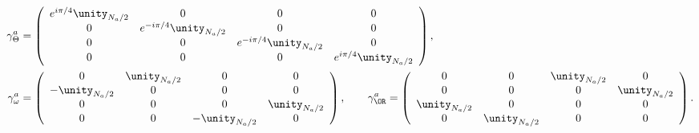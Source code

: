 \begin{equation}
\begin{aligned}
\gamma^a_{\Theta} &= \left(\begin{array}{cccc}
e^{i\pi/4}\unity_{N_a/2}  & 0 & 0 & 0\\
0 & e^{-i\pi/4}\unity_{N_a/2} & 0 & 0\\
0 & 0 & e^{-i\pi/4}\unity_{N_a/2} & 0\\
0 & 0 & 0 & e^{i\pi/4}\unity_{N_a/2}
\end{array}\right),\\
\gamma^a_{\omega} & = \left(\begin{array}{cccc}
0 &  \unity_{N_a/2} & 0 & 0\\
-\unity_{N_a/2} & 0 & 0 & 0\\
0 & 0 & 0 &  \unity_{N_a/2}\\
0 & 0 & -\unity_{N_a/2} & 0
\end{array}\right),  \qquad
\gamma^a_{\OR} = \left(\begin{array}{cccc}
0 & 0 & \unity_{N_a/2} & 0\\
0 & 0 & 0 &  \unity_{N_a/2}\\
\unity_{N_a/2} & 0 & 0 & 0\\
0 &  \unity_{N_a/2} & 0 & 0
\end{array}\right).
\end{aligned}   \label{EqChanPatonMatrices}
\end{equation}

